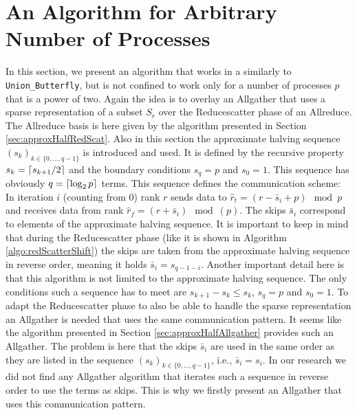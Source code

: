 \newpage
\section{An Algorithm for Arbitrary Number of Processes} \label{sec:irregularImpl}
In this section, we present an algorithm that works in a similarly to \texttt{Union\_Butterfly}, but is not confined to work only for a number of processes $p$ that is a power of two. Again the idea is to overlay an Allgather that uses a sparse representation of a subset $S_r$ over the Reducescatter phase of an Allreduce. The Allreduce basis is here given by the algorithm presented in Section \ref{sec:approxHalfRedScat}. Also in this section the approximate halving sequence $(s_k)_{k\in \{0,\dots, q-1\}}$ is introduced and used. It is defined by the recursive property $s_k = \lceil s_{k+1}/2\rceil$ and the boundary conditions $s_q=p$ and $s_0=1$. This sequence has obviously $q=\lceil\log_2{p}\rceil$ terms. This sequence defines the communication scheme: In iteration $i$ (counting from 0) rank $r$ sends data to $\hat{r}_t=(r-\bar{s}_i + p)\mod{p}$ and receives data from rank $\hat{r}_f=(r+\bar{s}_i)\mod(p)$. The skips $\bar{s}_i$ correspond to elements of the approximate halving sequence. It is important to keep in mind that during the Reducescatter phase (like it is shown in Algorithm \ref{algo:redScatterShift}) the skips are taken from the approximate halving sequence in reverse order, meaning it holds $\bar{s}_i = s_{q-1-i}$. Another important detail here is that this algorithm is not limited to the approximate halving sequence. The only conditions such a sequence has to meet are $s_{k+1} - s_k \leq s_k$, $s_q=p$ and $s_0=1$. To adapt the Reducescatter phase to also be able to handle the sparse representation an Allgather is needed that uses the same communication pattern. It seems like the algorithm presented in Section \ref{sec:approxHalfAllgather} provides such an Allgather. The problem is here that the skips $\bar{s}_i$ are used in the same order as they are listed in the sequence $(s_k)_{k\in \{0,\dots, q-1\}}$, i.e., $\bar{s}_i = s_i$. In our research we did not find any Allgather algorithm that iterates such a sequence in reverse order to use the terms as skips. This is why we firstly present an Allgather that uses this communication pattern.


